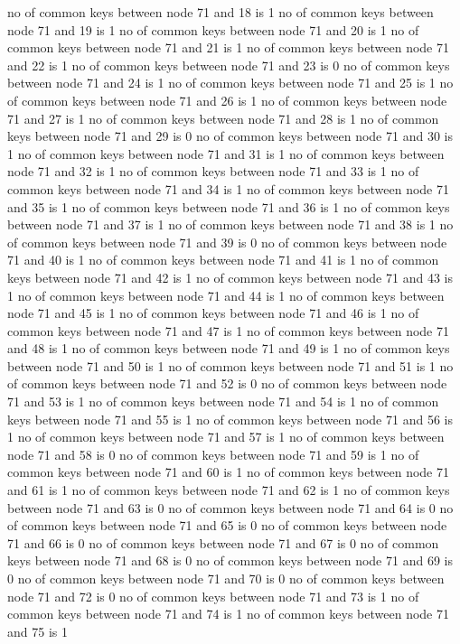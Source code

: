 no of common keys between node 71 and 18 is 1
no of common keys between node 71 and 19 is 1
no of common keys between node 71 and 20 is 1
no of common keys between node 71 and 21 is 1
no of common keys between node 71 and 22 is 1
no of common keys between node 71 and 23 is 0
no of common keys between node 71 and 24 is 1
no of common keys between node 71 and 25 is 1
no of common keys between node 71 and 26 is 1
no of common keys between node 71 and 27 is 1
no of common keys between node 71 and 28 is 1
no of common keys between node 71 and 29 is 0
no of common keys between node 71 and 30 is 1
no of common keys between node 71 and 31 is 1
no of common keys between node 71 and 32 is 1
no of common keys between node 71 and 33 is 1
no of common keys between node 71 and 34 is 1
no of common keys between node 71 and 35 is 1
no of common keys between node 71 and 36 is 1
no of common keys between node 71 and 37 is 1
no of common keys between node 71 and 38 is 1
no of common keys between node 71 and 39 is 0
no of common keys between node 71 and 40 is 1
no of common keys between node 71 and 41 is 1
no of common keys between node 71 and 42 is 1
no of common keys between node 71 and 43 is 1
no of common keys between node 71 and 44 is 1
no of common keys between node 71 and 45 is 1
no of common keys between node 71 and 46 is 1
no of common keys between node 71 and 47 is 1
no of common keys between node 71 and 48 is 1
no of common keys between node 71 and 49 is 1
no of common keys between node 71 and 50 is 1
no of common keys between node 71 and 51 is 1
no of common keys between node 71 and 52 is 0
no of common keys between node 71 and 53 is 1
no of common keys between node 71 and 54 is 1
no of common keys between node 71 and 55 is 1
no of common keys between node 71 and 56 is 1
no of common keys between node 71 and 57 is 1
no of common keys between node 71 and 58 is 0
no of common keys between node 71 and 59 is 1
no of common keys between node 71 and 60 is 1
no of common keys between node 71 and 61 is 1
no of common keys between node 71 and 62 is 1
no of common keys between node 71 and 63 is 0
no of common keys between node 71 and 64 is 0
no of common keys between node 71 and 65 is 0
no of common keys between node 71 and 66 is 0
no of common keys between node 71 and 67 is 0
no of common keys between node 71 and 68 is 0
no of common keys between node 71 and 69 is 0
no of common keys between node 71 and 70 is 0
no of common keys between node 71 and 72 is 0
no of common keys between node 71 and 73 is 1
no of common keys between node 71 and 74 is 1
no of common keys between node 71 and 75 is 1
